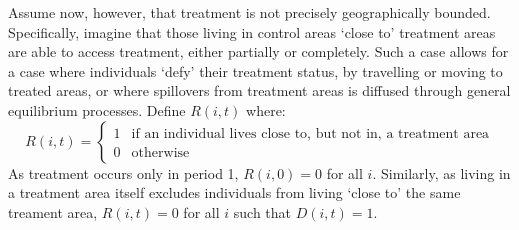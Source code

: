 \documentclass{article}
\begin{document}
\begin{spacing}{1.1}
Assume now, however, that treatment is not precisely geographically bounded.  
Specifically, imagine that those living in control areas `close to' treatment 
areas are able to access treatment, either partially or completely.  Such a 
case allows for a case where individuals `defy' their treatment status, by 
travelling or moving to treated areas, or where spillovers from treatment 
areas is diffused through general equilibrium processes.  Define $R(i,t)$ 
where:
\begin{equation}
 R(i,t) =
  \begin{cases}
   1   & \text{if an individual lives close to, but not in, a treatment area} \\
   0   & \text{otherwise} 
  \end{cases}
\end{equation}
As treatment occurs only in period 1, $R(i,0)=0$ for all $i$.  Similarly, as 
living in a treatment area itself excludes individuals from living `close to' 
the same treament area, $R(i,t)=0$ for all $i$ such that $D(i,t)=1$.


\end{spacing}
\end{document}
